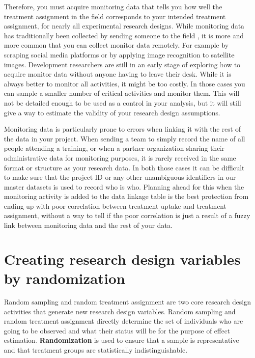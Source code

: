Therefore, you must acquire monitoring data that
tells you how well the treatment assignment in the field
corresponds to your intended treatment assignment,
for nearly all experimental research designs.
While monitoring data has traditionally been collected by sending someone to the field ,
it is more and more common that you can collect monitor data remotely.
For example by scraping social media platforms
or by applying image recognition to satellite images.
Development researchers are still in an early stage
of exploring how to acquire monitor data
without anyone having to leave their desk.
While it is always better to monitor all activities,
it might be too costly.
In those cases you can sample a smaller number of critical activities and monitor them.
This will not be detailed enough to be used as a control in your analysis,
but it will still give a way to
estimate the validity of your research design assumptions.

Monitoring data is particularly prone to errors
when linking it with the rest of the data in your project.
When sending a team to simply record the name of all people attending a training,
or when a partner organization sharing their administrative data for monitoring purposes,
it is rarely received in the same format or structure as your research data.
In both those cases it can be difficult to make sure that
the project ID or any other unambiguous identifiers in our master datasets
is used to record who is who.
Planning ahead for this when the monitoring activity is added to the data linkage table
is the best protection from ending up with poor correlation
between treatment uptake and treatment assignment,
without a way to tell if the poor correlation is just
a result of a fuzzy link between monitoring data and the rest of your data.

\section{Creating research design variables by randomization}

Random sampling and random treatment assignment
are two core research design activities
that generate new research design variables.
Random sampling and random treatment assignment directly determine
the set of individuals who are going to be observed
and what their status will be for the purpose of effect estimation.
\textbf{Randomization}
is used to ensure that a sample is representative and
that treatment groups are statistically indistinguishable.

